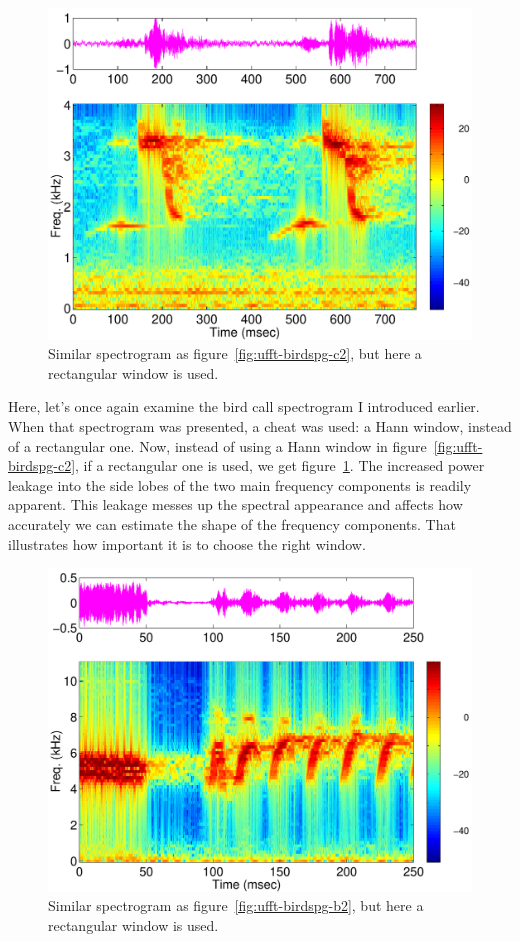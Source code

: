 \begin{figure}
\centerline{\includegraphics[height=0.35\textheight]{ch-fft/ufft_cardinal1_spg128_127rect}}
\caption{Similar spectrogram as
figure~\protect\ref{fig:ufft-birdspg-c2}, but here a rectangular
window is used.\label{fig:ufft-birdspg-c3}}
\end{figure}

Here, let's once again examine the bird call spectrogram I introduced
earlier. When that spectrogram was presented, a cheat was used: a Hann
window, instead of a rectangular one. Now, instead of using a Hann
window in figure~\ref{fig:ufft-birdspg-c2}, if a rectangular one is used,
we get figure~\ref{fig:ufft-birdspg-c3}. The increased power leakage
into the side lobes of the two main frequency components is readily
apparent. This leakage messes up the spectral appearance and affects
how accurately we can estimate the shape of the frequency components.
That illustrates how important it is to choose the right window.

\begin{figure}
\centerline{\includegraphics[height=0.5\textheight]{ch-fft/ufft_bluewing1am_spg128_127rect}}
\caption{Similar spectrogram as figure~\ref{fig:ufft-birdspg-b2}, but
here a rectangular window is used.\label{fig:ufft-birdspg-b3}}
\end{figure}

